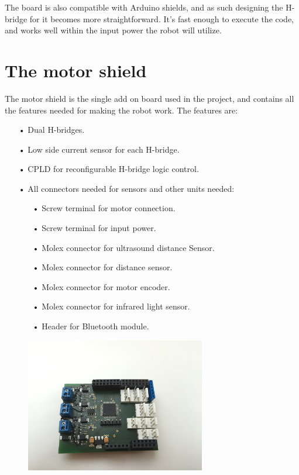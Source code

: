 The board is also compatible with Arduino shields, and as such designing the H-bridge for it
becomes more straightforward. It's fast enough to execute the code, and works well within the
input power the robot will utilize.

\section{The motor shield}
The motor shield is the single add on board used in the project, and contains all the features needed for making the robot work.
The features are:
\begin{enumerate}
	\item[•]Dual H-bridges.
	\item[•]Low side current sensor for each H-bridge.
	\item[•]CPLD for reconfigurable H-bridge logic control.
	\item[•]All connectors needed for sensors and other units needed:
	\begin{enumerate}
		\item[•]Screw terminal for motor connection.
		\item[•]Screw terminal for input power.
		\item[•]Molex connector for ultrasound distance Sensor.
		\item[•]Molex connector for  distance sensor.
		\item[•]Molex connector for motor encoder.
		\item[•]Molex connector for infrared light sensor.
		\item[•]Header for Bluetooth module.
	\end{enumerate}
\end{enumerate}

\begin{figure}[!ht]
	\centering
	\includegraphics[width=0.7\textwidth]{figures/motorShield.jpg}
	\caption{}
	\label{Motorshield}
\end{figure}

